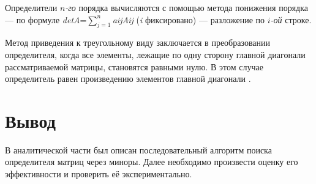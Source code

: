 Определители $n$\textit{-го} порядка вычисляются с помощью метода понижения порядка --- по формуле \textit{detA}=$\sum\limits_{j=1}^n$\textit{aij}\textit{Aij} (\textit{i} фиксировано) --- разложение по $i$\textit{-ой} строке.

Метод приведения к треугольному виду заключается в преобразовании определителя, когда все элементы, лежащие по одну сторону главной диагонали рассматриваемой матрицы, становятся равными нулю. В этом случае определитель равен произведению элементов главной диагонали \cite{dig}.

\section*{Вывод}
В аналитической части был описан последовательный алгоритм поиска определителя матриц через миноры. Далее необходимо произвести оценку его эффективности и проверить её экспериментально.
